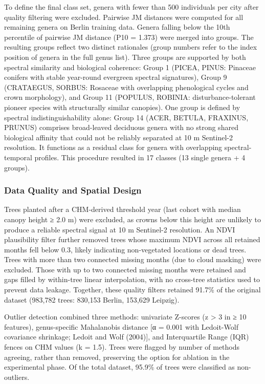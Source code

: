 \documentclass[11pt,a4paper]{scrartcl}
\begin{document}
To define the final class set, genera with fewer than 500 individuals
per city after quality filtering were excluded. Pairwise JM distances
were computed for all remaining genera on Berlin training data. Genera
falling below the 10th percentile of pairwise JM distance (P10 = 1.373)
were merged into groups. The resulting groups reflect two distinct
rationales (group numbers refer to the index position of genera in the
full genus list). Three groups are supported by both spectral similarity
and biological coherence: Group 1 (PICEA, PINUS: Pinaceae conifers with
stable year-round evergreen spectral signatures), Group 9 (CRATAEGUS,
SORBUS: Rosaceae with overlapping phenological cycles and crown
morphology), and Group 11 (POPULUS, ROBINIA: disturbance-tolerant
pioneer species with structurally similar canopies). One group is
defined by spectral indistinguishability alone: Group 14 (ACER, BETULA,
FRAXINUS, PRUNUS) comprises broad-leaved deciduous genera with no strong
shared biological affinity that could not be reliably separated at 10 m
Sentinel-2 resolution. It functions as a residual class for genera with
overlapping spectral-temporal profiles. This procedure resulted in 17
classes (13 single genera + 4 groups).

\subsubsection{Data Quality and Spatial
Design}\label{data-quality-and-spatial-design}

Trees planted after a CHM-derived threshold year (last cohort with
median canopy height ≥ 2.0 m) were excluded, as crowns below this height
are unlikely to produce a reliable spectral signal at 10 m Sentinel-2
resolution. An NDVI plausibility filter further removed trees whose
maximum NDVI across all retained months fell below 0.3, likely
indicating non-vegetated locations or dead trees. Trees with more than
two connected missing months (due to cloud masking) were excluded. Those
with up to two connected missing months were retained and gaps filled by
within-tree linear interpolation, with no cross-tree statistics used to
prevent data leakage. Together, these quality filters retained 91.7\% of
the original dataset (983,782 trees: 830,153 Berlin, 153,629 Leipzig).

Outlier detection combined three methods: univariate Z-scores
(\textbar z\textbar{} \textgreater{} 3 in ≥ 10 features), genus-specific
Mahalanobis distance {[}α = 0.001 with Ledoit-Wolf covariance shrinkage;
Ledoit and Wolf (2004){]}, and Interquartile Range (IQR) fences on CHM
values (k = 1.5). Trees were flagged by number of methods agreeing,
rather than removed, preserving the option for ablation in the
experimental phase. Of the total dataset, 95.9\% of trees were
classified as non-outliers.
\end{document}
